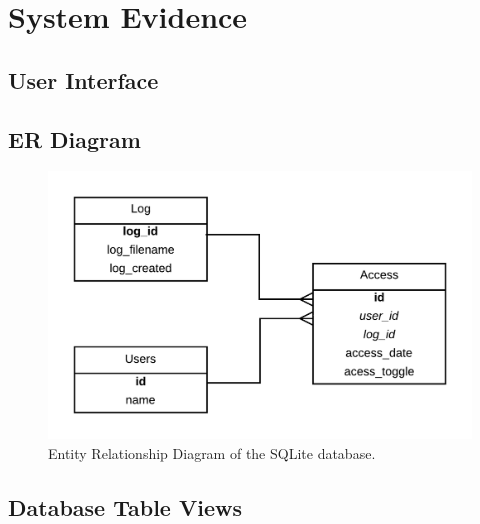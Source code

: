 \documentclass[a4paper]{article}
\begin{document}
\section{System Evidence}
    \subsection{User Interface}
    \subsection{ER Diagram}
    \begin{figure}[H]
        \caption{Entity Relationship Diagram of the SQLite database.}
        \centering
        \includegraphics[scale=0.3]{../shared_assets/diagrams/ERD.png}
    \end{figure}

    \subsection{Database Table Views}
\end{document}
